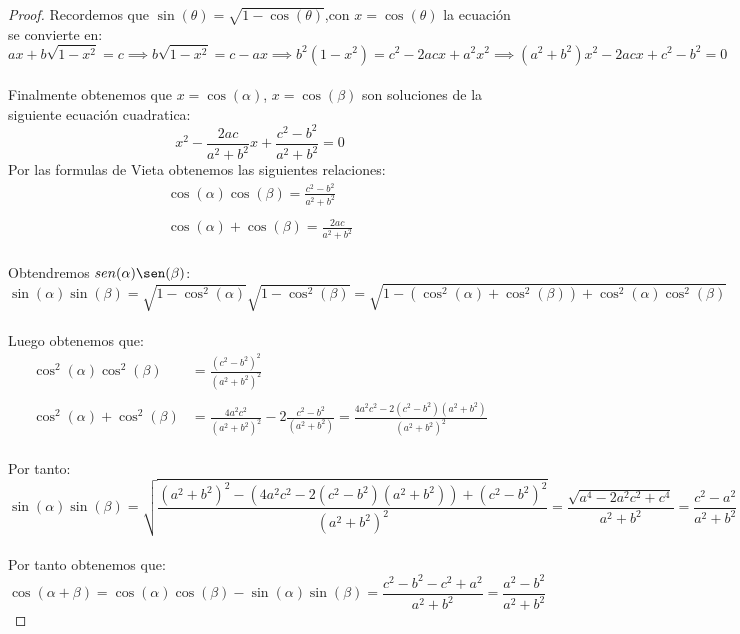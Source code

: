 \documentclass[11pt,letterpaper]{article}
\begin{document}
\begin{proof}
    Recordemos que $\sin(\theta)=\sqrt{1-\cos(\theta)}$,con $x=\cos(\theta)$ la ecuaci\'on se convierte en:\,\\
    \begin{equation*}
        ax+b\sqrt{1-x^2}=c\implies b\sqrt{1-x^2}=c-ax\implies b^2(1-x^2)=c^2-2acx+a^2x^2\implies (a^2+b^2)x^2-2acx+c^2-b^2=0
    \end{equation*}\,\\
    Finalmente obtenemos que $x=\cos(\alpha)$, $x=\cos(\beta)$ son soluciones de la siguiente ecuaci\'on cuadratica:\,\\
    \begin{equation*}
        x^2-\frac{2ac}{a^2+b^2}x+\frac{c^2-b^2}{a^2+b^2}=0
    \end{equation*}
    Por las formulas de Vieta obtenemos las siguientes relaciones:\,\\
    \begin{align*}
        \cos(\alpha)\cos(\beta)=\frac{c^2-b^2}{a^2+b^2}\,\\
        \,\\
        \cos(\alpha)+\cos(\beta)=\frac{2ac}{a^2+b^2}
    \end{align*}\,\\
    Obtendremos $sen(\alpha)\sen(\beta)$:\,\\
    \begin{equation*}
        \sin(\alpha)\sin(\beta)=\sqrt{1-\cos^2(\alpha)}\sqrt{1-\cos^2(\beta)}=\sqrt{1-(\cos^2(\alpha)+\cos^2(\beta))+\cos^2(\alpha)\cos^2(\beta)}
    \end{equation*}\,\\
    Luego obtenemos que:\,\\
    \begin{align*}
        \cos^2(\alpha)\cos^2(\beta)&=\frac{(c^2-b^2)^2}{(a^2+b^2)^2}\,\\
        \,\\
        \cos^2(\alpha)+\cos^2(\beta)&=\frac{4a^2c^2}{(a^2+b^2)^2}-2\frac{c^2-b^2}{(a^2+b^2)}=\frac{4a^2c^2-2(c^2-b^2)(a^2+b^2)}{(a^2+b^2)^2}
    \end{align*}\,\\
    Por tanto:\,\\
    \begin{equation*}
        \sin(\alpha)\sin(\beta)=\sqrt{\frac{(a^2+b^2)^2-(4a^2c^2-2(c^2-b^2)(a^2+b^2))+(c^2-b^2)^2}{(a^2+b^2)^2}}=\frac{\sqrt{a^4-2a^2c^2+c^4}}{a^2+b^2}=\frac{c^2-a^2}{a^2+b^2}
    \end{equation*}\,\\
    Por tanto obtenemos que:\,\\
    \begin{equation*}
        \cos(\alpha+\beta)=\cos(\alpha)\cos(\beta)-\sin(\alpha)\sin(\beta)=\frac{c^2-b^2-c^2+a^2}{a^2+b^2}=\frac{a^2-b^2}{a^2+b^2}
    \end{equation*}
\end{proof}
\end{document}
